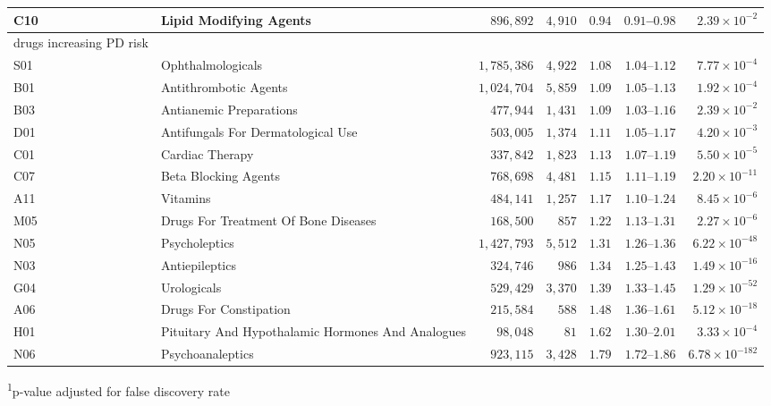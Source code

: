 \begin{longtable}{llrrrrr}
C10 & Lipid Modifying Agents & $896,892$ & $4,910$ & $0.94$ & $0.91$–$0.98$ & $2.39 \times 10^{-2}$ \\ 
\midrule
\multicolumn{1}{l}{drugs increasing PD risk} \\ 
\midrule
S01 & Ophthalmologicals & $1,785,386$ & $4,922$ & $1.08$ & $1.04$–$1.12$ & $7.77 \times 10^{-4}$ \\ 
B01 & Antithrombotic Agents & $1,024,704$ & $5,859$ & $1.09$ & $1.05$–$1.13$ & $1.92 \times 10^{-4}$ \\ 
B03 & Antianemic Preparations & $477,944$ & $1,431$ & $1.09$ & $1.03$–$1.16$ & $2.39 \times 10^{-2}$ \\ 
D01 & Antifungals For Dermatological Use & $503,005$ & $1,374$ & $1.11$ & $1.05$–$1.17$ & $4.20 \times 10^{-3}$ \\ 
C01 & Cardiac Therapy & $337,842$ & $1,823$ & $1.13$ & $1.07$–$1.19$ & $5.50 \times 10^{-5}$ \\ 
C07 & Beta Blocking Agents & $768,698$ & $4,481$ & $1.15$ & $1.11$–$1.19$ & $2.20 \times 10^{-11}$ \\ 
A11 & Vitamins & $484,141$ & $1,257$ & $1.17$ & $1.10$–$1.24$ & $8.45 \times 10^{-6}$ \\ 
M05 & Drugs For Treatment Of Bone Diseases & $168,500$ & $857$ & $1.22$ & $1.13$–$1.31$ & $2.27 \times 10^{-6}$ \\ 
N05 & Psycholeptics & $1,427,793$ & $5,512$ & $1.31$ & $1.26$–$1.36$ & $6.22 \times 10^{-48}$ \\ 
N03 & Antiepileptics & $324,746$ & $986$ & $1.34$ & $1.25$–$1.43$ & $1.49 \times 10^{-16}$ \\ 
G04 & Urologicals & $529,429$ & $3,370$ & $1.39$ & $1.33$–$1.45$ & $1.29 \times 10^{-52}$ \\ 
A06 & Drugs For Constipation & $215,584$ & $588$ & $1.48$ & $1.36$–$1.61$ & $5.12 \times 10^{-18}$ \\ 
H01 & Pituitary And Hypothalamic Hormones And Analogues & $98,048$ & $81$ & $1.62$ & $1.30$–$2.01$ & $3.33 \times 10^{-4}$ \\ 
N06 & Psychoanaleptics & $923,115$ & $3,428$ & $1.79$ & $1.72$–$1.86$ & $6.78 \times 10^{-182}$ \\ 
\bottomrule
\end{longtable}
\begin{minipage}{\linewidth}
\textsuperscript{1}p-value adjusted for false discovery rate\\
\end{minipage}

